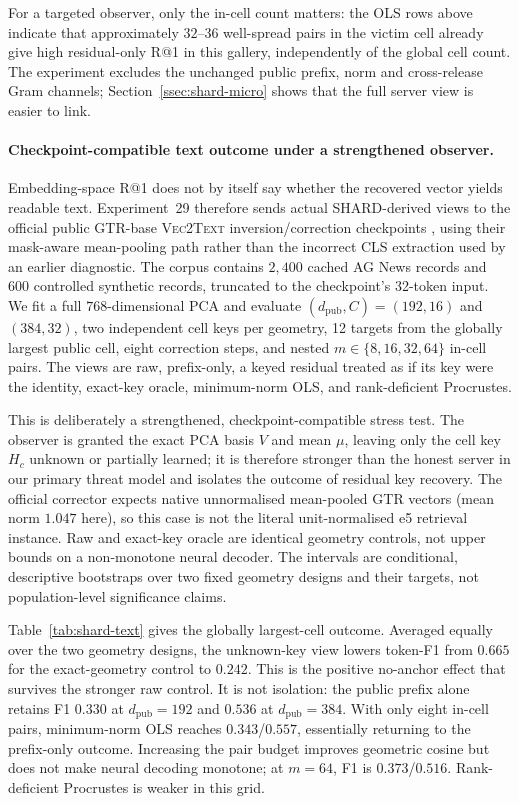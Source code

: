 \documentclass[11pt,a4paper]{article}
\begin{document}
For a targeted observer, only the in-cell count matters: the OLS rows above
indicate that approximately $32$--$36$ well-spread pairs in the victim cell
already give high residual-only R@1 in this gallery, independently of the
global cell count. The experiment excludes the unchanged public prefix, norm
and cross-release Gram channels; Section~\ref{ssec:shard-micro} shows that the
full server view is easier to link.

\paragraph{Checkpoint-compatible text outcome under a strengthened observer.}
\label{ssec:shard-text}
Embedding-space R@1 does not by itself say whether the recovered vector yields
readable text. Experiment~29 therefore sends actual SHARD-derived views to the
official public GTR-base \textsc{Vec2Text} inversion/correction checkpoints
\cite{ref_gtr,ref_vec2text}, using their mask-aware mean-pooling path rather
than the incorrect CLS extraction used by an earlier diagnostic. The corpus
contains $2{,}400$ cached AG News records and $600$ controlled synthetic
records, truncated to the checkpoint's 32-token input. We fit a full
$768$-dimensional PCA and evaluate $(d_{\mathrm{pub}},C)=(192,16)$ and
$(384,32)$, two independent cell keys per geometry, 12 targets from the
globally largest public cell, eight correction steps, and nested
$m\in\{8,16,32,64\}$ in-cell pairs. The views are raw, prefix-only, a keyed
residual treated as if its key were the identity, exact-key oracle,
minimum-norm OLS, and rank-deficient Procrustes.

This is deliberately a strengthened, checkpoint-compatible stress test. The
observer is granted the exact PCA basis $V$ and mean $\mu$, leaving only the
cell key $H_c$ unknown or partially learned; it is therefore stronger than the
honest server in our primary threat model and isolates the outcome of residual
key recovery. The official corrector expects native unnormalised mean-pooled
GTR vectors (mean norm $1.047$ here), so this case is not the literal
unit-normalised e5 retrieval instance. Raw and exact-key oracle are identical
geometry controls, not upper bounds on a non-monotone neural decoder. The
intervals are conditional, descriptive bootstraps over two fixed geometry
designs and their targets, not population-level significance claims.

Table~\ref{tab:shard-text} gives the globally largest-cell outcome. Averaged
equally over the two geometry designs, the unknown-key view lowers token-F1
from $0.665$ for the exact-geometry control to $0.242$. This is the positive
no-anchor effect that survives the stronger raw control. It is not isolation:
the public prefix alone retains F1 $0.330$ at $d_{\mathrm{pub}}=192$ and
$0.536$ at $d_{\mathrm{pub}}=384$. With only eight in-cell pairs,
minimum-norm OLS reaches $0.343$/$0.557$, essentially returning to the
prefix-only outcome. Increasing the pair budget improves geometric cosine but
does not make neural decoding monotone; at $m=64$, F1 is
$0.373$/$0.516$. Rank-deficient Procrustes is weaker in this grid.
\end{document}
